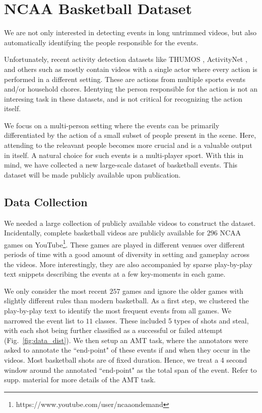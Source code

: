 
\section{NCAA Basketball Dataset}
We are not only interested in detecting events in long untrimmed videos, but
also automatically identifying the people responsible for the events.

Unfortunately, recent activity detection datasets like THUMOS \cite{THUMOS},
ActivityNet \cite{ActivityNet}, and others such as
\cite{UCF101,Finegrained_cooking} mostly contain videos with a single actor
where every action is performed in a different setting. These are actions from
multiple sports events and/or household chores.  Identying the person
responsible for the action is not an interesing task in these datasets, and is
not critical for recognizing the action itself.

We focus on a multi-person setting where the events can be primarily
differentiated by the action of a small subset of people present in the scene.
Here, attending to the releavant people becomes more crucial and is a valuable
output in itself. A natural choice for such events is a multi-player sport.
With this in mind, we have collected a new large-scale dataset of basketball
events. This dataset will be made publicly available upon publication.

\subsection{Data Collection}
We needed a large collection of publicly available videos to construct the dataset.
Incidentally, complete basketball videos are
publicly available for $296$ NCAA games on
YouTube\footnote{https://www.youtube.com/user/ncaaondemand}.  These games are
played in different venues over different periods of time with a good amount of
diversity in setting and gameplay across the videos. More interestingly, they
are also accompanied by sparse play-by-play text snippets describing the events
at a few key-moments in each game.

We only consider the most recent $257$ games and ignore the older games with
slightly different rules than modern basketball.  As a first step, we clustered the
play-by-play text to identify the most frequent events from all games. We
narrowed the event list to $11$ classes. These included 5 types of shots and
steal, with each shot being further classified as a successful or failed
attempt (Fig.~\ref{fig:data_dist}). We then setup an AMT task, where the
annotators were asked to annotate the ``end-point" of these events if and when
they occur in the videos. Most basketball shots are of fixed duration. Hence,
we treat a 4 second window around the annotated ``end-point" as the total span
of the event.  Refer to supp. material for more details of the AMT task.

